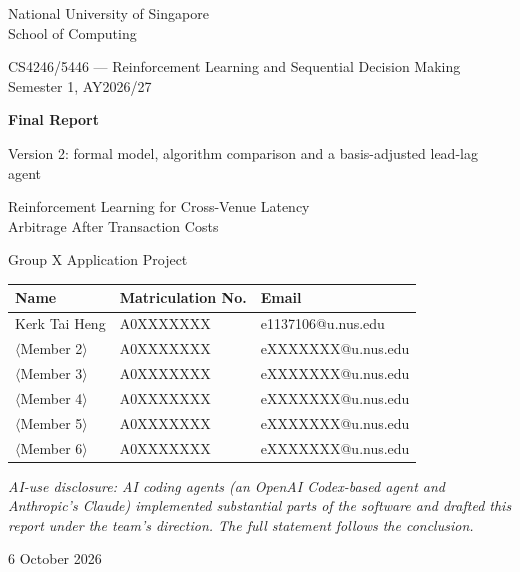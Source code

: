 \documentclass[12pt,a4paper]{article}
\begin{document}

\begin{titlepage}
\centering
\vspace*{1.2cm}
{\large National University of Singapore \\ School of Computing \par}
\vspace{0.4cm}
{\large CS4246/5446 --- Reinforcement Learning and Sequential Decision Making \\
Semester 1, AY2026/27 \par}
\vspace{1.4cm}
{\LARGE\bfseries Final Report \par}
\vspace{0.3cm}
{\large Version 2: formal model, algorithm comparison and a basis-adjusted lead-lag agent \par}
\vspace{0.6cm}
{\Large Reinforcement Learning for Cross-Venue Latency\\[2pt]
Arbitrage After Transaction Costs \par}
\vspace{1.4cm}
{\large Group X \quad\textbar\quad Application Project \par}
\vspace{1.1cm}

\begin{tabular}{@{}lll@{}}
\toprule
\textbf{Name} & \textbf{Matriculation No.} & \textbf{Email} \\
\midrule
Kerk Tai Heng      & A0XXXXXXX & e1137106@u.nus.edu \\
$\langle$Member 2$\rangle$ & A0XXXXXXX & eXXXXXXX@u.nus.edu \\
$\langle$Member 3$\rangle$ & A0XXXXXXX & eXXXXXXX@u.nus.edu \\
$\langle$Member 4$\rangle$ & A0XXXXXXX & eXXXXXXX@u.nus.edu \\
$\langle$Member 5$\rangle$ & A0XXXXXXX & eXXXXXXX@u.nus.edu \\
$\langle$Member 6$\rangle$ & A0XXXXXXX & eXXXXXXX@u.nus.edu \\
\bottomrule
\end{tabular}

\vspace{0.8cm}
{\normalsize\textit{AI-use disclosure: AI coding agents (an OpenAI Codex-based agent and
Anthropic's Claude) implemented substantial parts of the software and drafted this report
under the team's direction. The full statement follows the conclusion.}\par}

\vfill
{\normalsize 6 October 2026 \par}
\end{titlepage}
\end{document}
